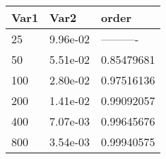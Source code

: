 \begin{tabular}{lll}
Var1 & Var2 & order \\ 
\hline 
25 & 9.96e-02 & ---------- \\ 
50 & 5.51e-02 & 0.85479681 \\ 
100 & 2.80e-02 & 0.97516136 \\ 
200 & 1.41e-02 & 0.99092057 \\ 
400 & 7.07e-03 & 0.99645676 \\ 
800 & 3.54e-03 & 0.99940575 \\ 
\hline 
\end{tabular}